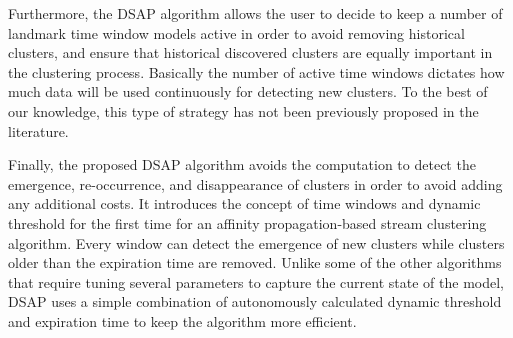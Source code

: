 Furthermore, the DSAP algorithm allows the user to decide to keep a number of landmark time window models active in order to avoid removing historical clusters, and ensure that historical discovered clusters are equally important in the clustering process. Basically the number of active time windows dictates how much data will be used continuously for detecting new clusters. To the best of our knowledge, this type of strategy has not been previously proposed in the literature.




Finally, the proposed DSAP algorithm avoids the computation to detect the emergence, re-occurrence, and disappearance of clusters in order to avoid adding any additional costs. It introduces the concept of time windows and dynamic threshold for the first time for an affinity propagation-based stream clustering algorithm. Every window can detect the emergence of new clusters while clusters older than the expiration time are removed. Unlike some of the other algorithms that require tuning several parameters to capture the current state of the model, DSAP uses a simple combination of autonomously calculated dynamic threshold and expiration time to keep the algorithm more efficient.



 







